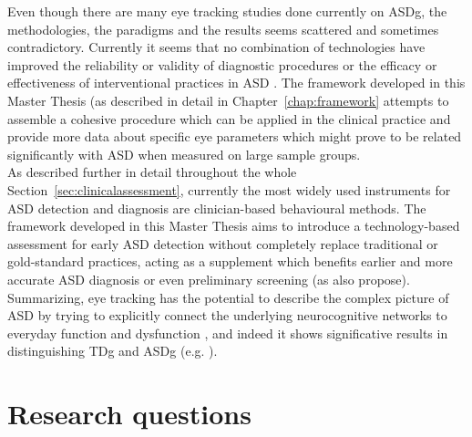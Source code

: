 Even though there are many eye tracking studies done currently on ASDg, the methodologies, the paradigms and the results seems scattered and sometimes contradictory. Currently  it seems that no combination of technologies have improved the reliability or validity of diagnostic procedures or the efficacy or effectiveness of interventional practices in ASD \cite{bolte2016detection}. The framework developed in this Master Thesis (as described in detail in Chapter~\ref{chap:framework} attempts to assemble a cohesive procedure which can be applied in the clinical practice and provide more data about specific eye parameters which might prove to be related significantly with ASD when measured on large sample groups.\\
As described further in detail throughout the whole Section~\ref{sec:clinicalassessment}, currently the most widely used instruments for ASD detection and diagnosis are clinician-based behavioural methods. The framework developed in this Master Thesis aims to introduce a technology-based assessment for early ASD detection without completely replace traditional or gold-standard practices, acting as a supplement which benefits earlier and more accurate ASD diagnosis or even preliminary screening (as \citealp{liu2015machinelearning} also propose).\\
Summarizing, eye tracking has the potential to describe the complex picture of ASD by trying to explicitly connect the underlying neurocognitive networks to everyday function and dysfunction \citep{falck-ytter2013eyetrackingASD}, and indeed it shows significative results in distinguishing TDg and ASDg (e.g.  \citealp{boraston2007eyetrackingASD,papagiannopoulou2014review,bolte2016detection,johnson2016review}).






\section{Research questions}
\label{sec:researchquestions}

